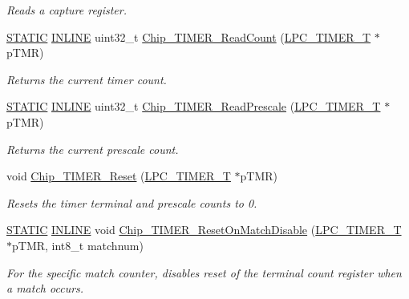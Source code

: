 \begin{DoxyCompactItemize}
\begin{DoxyCompactList}\small\item\em Reads a capture register. \end{DoxyCompactList}\item 
\hyperlink{group__LPC__Types__Public__Macros_ga10b2d890d871e1489bb02b7e70d9bdfb}{S\+T\+A\+T\+IC} \hyperlink{group__LPC__Types__Public__Types_ga2eb6f9e0395b47b8d5e3eeae4fe0c116}{I\+N\+L\+I\+NE} uint32\+\_\+t \hyperlink{group__TIMER__17XX__40XX_ga6050d4da70d679696b3af922b8c1a6ac}{Chip\+\_\+\+T\+I\+M\+E\+R\+\_\+\+Read\+Count} (\hyperlink{structLPC__TIMER__T}{L\+P\+C\+\_\+\+T\+I\+M\+E\+R\+\_\+T} $\ast$p\+T\+MR)
\begin{DoxyCompactList}\small\item\em Returns the current timer count. \end{DoxyCompactList}\item 
\hyperlink{group__LPC__Types__Public__Macros_ga10b2d890d871e1489bb02b7e70d9bdfb}{S\+T\+A\+T\+IC} \hyperlink{group__LPC__Types__Public__Types_ga2eb6f9e0395b47b8d5e3eeae4fe0c116}{I\+N\+L\+I\+NE} uint32\+\_\+t \hyperlink{group__TIMER__17XX__40XX_ga52328278a0f1326c6ce7dc210ad010d3}{Chip\+\_\+\+T\+I\+M\+E\+R\+\_\+\+Read\+Prescale} (\hyperlink{structLPC__TIMER__T}{L\+P\+C\+\_\+\+T\+I\+M\+E\+R\+\_\+T} $\ast$p\+T\+MR)
\begin{DoxyCompactList}\small\item\em Returns the current prescale count. \end{DoxyCompactList}\item 
void \hyperlink{group__TIMER__17XX__40XX_gaba0336e88cc662505e2dde1eabff1aaf}{Chip\+\_\+\+T\+I\+M\+E\+R\+\_\+\+Reset} (\hyperlink{structLPC__TIMER__T}{L\+P\+C\+\_\+\+T\+I\+M\+E\+R\+\_\+T} $\ast$p\+T\+MR)
\begin{DoxyCompactList}\small\item\em Resets the timer terminal and prescale counts to 0. \end{DoxyCompactList}\item 
\hyperlink{group__LPC__Types__Public__Macros_ga10b2d890d871e1489bb02b7e70d9bdfb}{S\+T\+A\+T\+IC} \hyperlink{group__LPC__Types__Public__Types_ga2eb6f9e0395b47b8d5e3eeae4fe0c116}{I\+N\+L\+I\+NE} void \hyperlink{group__TIMER__17XX__40XX_gae203cf1a04cbbf63e966de3a5bd9c29e}{Chip\+\_\+\+T\+I\+M\+E\+R\+\_\+\+Reset\+On\+Match\+Disable} (\hyperlink{structLPC__TIMER__T}{L\+P\+C\+\_\+\+T\+I\+M\+E\+R\+\_\+T} $\ast$p\+T\+MR, int8\+\_\+t matchnum)
\begin{DoxyCompactList}\small\item\em For the specific match counter, disables reset of the terminal count register when a match occurs. \end{DoxyCompactList}\item 

\end{DoxyCompactItemize}
